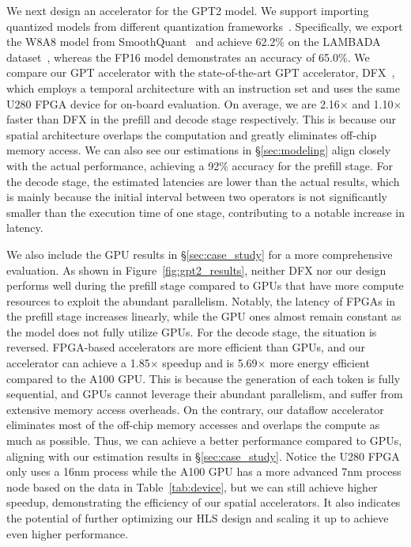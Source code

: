 We next design an accelerator for the GPT2 model.
We support importing quantized models from different quantization frameworks~\cite{xiao2023smoothquant,zhao2023atom,chee2023quip}.
Specifically, we export the W8A8 model from SmoothQuant~\cite{xiao2023smoothquant} and achieve 62.2\% on the LAMBADA dataset~\cite{denis2016lambada}, whereas the FP16 model demonstrates an accuracy of 65.0\%.
We compare our GPT accelerator with the state-of-the-art GPT accelerator, DFX~\cite{hong2022dfx}, which employs a temporal architecture with an instruction set and uses the same U280 FPGA device for on-board evaluation.
On average, we are 2.16$\times$ and 1.10$\times$ faster than DFX in the prefill and decode stage respectively.
This is because our spatial architecture overlaps the computation and greatly eliminates off-chip memory access.
We can also see our estimations in \S\ref{sec:modeling} align closely with the actual performance, achieving a 92\% accuracy for the prefill stage.
For the decode stage, the estimated latencies are lower than the actual results, which is mainly because the initial interval between two operators is not significantly smaller than the execution time of one stage, contributing to a notable increase in latency.

We also include the GPU results in \S\ref{sec:case_study} for a more comprehensive evaluation.
As shown in Figure~\ref{fig:gpt2_results}, neither DFX nor our design performs well during the prefill stage compared to GPUs that have more compute resources to exploit the abundant parallelism.
Notably, the latency of FPGAs in the prefill stage increases linearly, while the GPU ones almost remain constant as the model does not fully utilize GPUs.
For the decode stage, the situation is reversed.
FPGA-based accelerators are more efficient than GPUs, and our accelerator can achieve a 1.85$\times$ speedup and is 5.69$\times$ more energy efficient compared to the A100 GPU.
This is because the generation of each token is fully sequential, and GPUs cannot leverage their abundant parallelism, and suffer from extensive memory access overheads.
On the contrary, our dataflow accelerator eliminates most of the off-chip memory accesses and overlaps the compute as much as possible.
Thus, we can achieve a better performance compared to GPUs, aligning with our estimation results in \S\ref{sec:case_study}.
Notice the U280 FPGA only uses a 16nm process while the A100 GPU has a more advanced 7nm process node based on the data in Table~\ref{tab:device}, but we can still achieve higher speedup, demonstrating the efficiency of our spatial accelerators.
It also indicates the potential of further optimizing our HLS design and scaling it up to achieve even higher performance.

